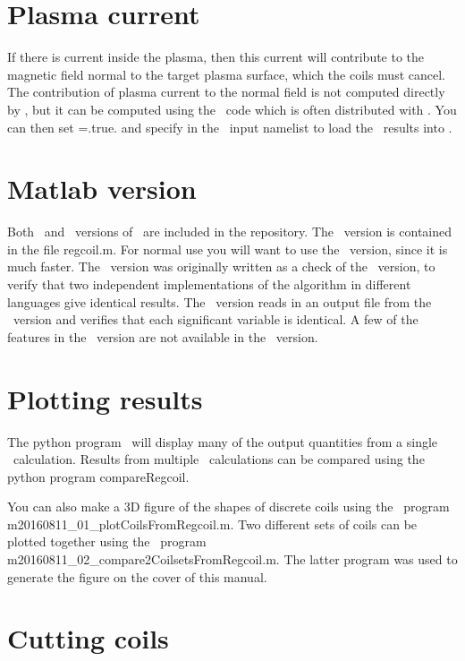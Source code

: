 \section{Plasma current}

If there is current inside the plasma, then this current will contribute to the magnetic field normal
to the target plasma surface, which the coils must cancel. The contribution of plasma current to the normal field
is not computed directly by \regcoil, but it can be computed using the \bnorm~code which is 
often distributed with \vmec.  You can then set ={\ttfamily .true.} and specify 
in the \regcoil~input namelist to load the \bnorm~results into \regcoil.

\section{Matlab version}

Both \fortran~and \matlab~versions of \regcoil~are included in the repository.  The \matlab~version is
contained in the file {\ttfamily regcoil.m}. For normal
use you will want to use the \fortran~version, since it is much faster.  The \matlab~version was originally
written as a check of the \fortran~version, to verify that two independent implementations of the algorithm
in different languages give identical results.  The \matlab~version reads in an output file from the \fortran~version
and verifies that each significant variable is identical.  A few of the features in the \fortran~version
are not available in the \matlab~version.

\section{Plotting results}

The python program \regcoilPlot~will display many of the output quantities from a single \regcoil~calculation.
Results from multiple \regcoil~calculations can be compared using the python program {\ttfamily compareRegcoil}.

You can also make a 3D figure of the shapes of discrete coils using the \matlab~program {\ttfamily m20160811\_01\_plotCoilsFromRegcoil.m}.
Two different sets of coils can be plotted together using the \matlab~program {\ttfamily m20160811\_02\_compare2CoilsetsFromRegcoil.m}.
The latter program was used to generate the figure on the cover of this manual.

\section{Cutting coils}

